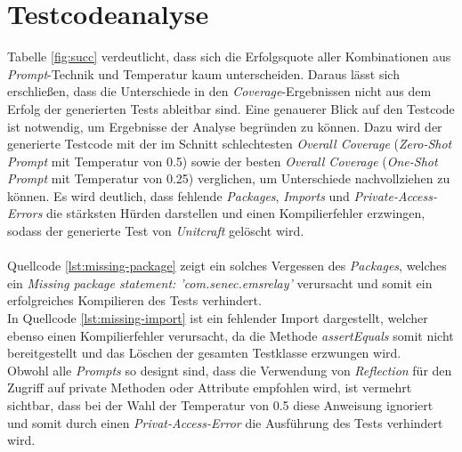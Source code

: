 \section{Testcodeanalyse}
Tabelle \ref{fig:succ} verdeutlicht, dass sich die Erfolgsquote aller Kombinationen aus \textit{Prompt}-Technik und Temperatur kaum unterscheiden. Daraus lässt sich erschließen, dass die Unterschiede in den \textit{Coverage}-Ergebnissen nicht aus dem Erfolg der generierten Tests ableitbar sind. Eine genauerer Blick auf den Testcode ist notwendig, um Ergebnisse der Analyse begründen zu können. Dazu wird der generierte Testcode mit der im Schnitt schlechtesten \textit{Overall Coverage}  (\textit{Zero-Shot Prompt} mit Temperatur von 0.5) sowie der besten \textit{Overall Coverage}  (\textit{One-Shot Prompt} mit Temperatur von 0.25) verglichen, um Unterschiede nachvollziehen zu können. Es wird deutlich, dass fehlende \textit{Packages}, \textit{Imports} und \textit{Private-Access-Errors} die stärksten Hürden darstellen und einen Kompilierfehler erzwingen, sodass der generierte Test von \textit{Unitcraft} gelöscht wird. \\\\
Quellcode \ref{lst:missing-package} zeigt ein solches Vergessen des \textit{Packages}, welches ein \textit{Missing package statement: 'com.senec.emsrelay'} verursacht und somit ein erfolgreiches Kompilieren des Tests verhindert.\\

In Quellcode \ref{lst:missing-import} ist ein fehlender Import dargestellt, welcher ebenso einen Kompilierfehler verursacht, da die Methode \textit{assertEquals} somit nicht bereitgestellt und das Löschen der gesamten Testklasse erzwungen wird.\\

Obwohl alle \textit{Prompts} so designt sind, dass die Verwendung von \textit{Reflection} für den Zugriff auf private Methoden oder Attribute empfohlen wird, ist vermehrt sichtbar, dass bei der Wahl der Temperatur von 0.5 diese Anweisung ignoriert und somit durch einen \textit{Privat-Access-Error} die Ausführung des Tests verhindert wird.\\
